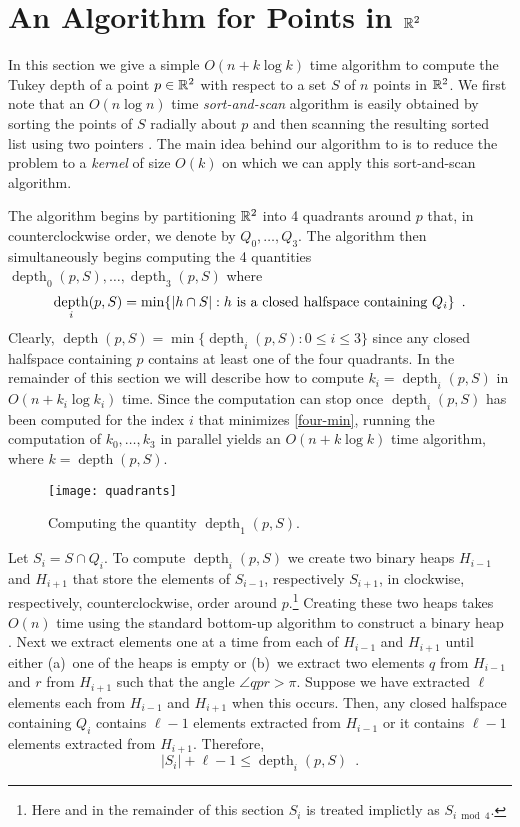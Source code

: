 \documentclass[charterfonts,lotsofwhite]{patmorin}
\DeclareMathOperator{\td}{depth}
\begin{document}
\section{An Algorithm for Points in $\mathbb{R}^2$}

In this section we give a simple $O(n + k\log k)$ time algorithm to
compute the Tukey depth of a point $p\in\mathbb{R}^2$ with respect to a set
$S$ of $n$ points in $\mathbb{R}^2$.  We first note that an $O(n\log n)$ time
\emph{sort-and-scan} algorithm is easily obtained by sorting the
points of $S$ radially about $p$ and then scanning the resulting
sorted list using two pointers \cite{m91}.  The main idea behind our
algorithm to is to reduce the problem to a \emph{kernel} of size
$O(k)$ on which we can apply this sort-and-scan algorithm.

The algorithm begins by partitioning $\mathbb{R}^2$ into 4 quadrants around
$p$ that, in counterclockwise order, we denote by $Q_0,\ldots,Q_3$.
The algorithm then simultaneously begins computing the 4 quantities
$\td_0(p,S),\ldots,\td_3(p,S)$ where 
\begin{equation}
     \td_i(p,S) = \min\{|h\cap S| : \mbox{$h$ is a closed halfspace containing $Q_i$} \} \enspace . \eqlabel{four-min}
\end{equation}
Clearly, $\td(p,S) = \min\{\td_i(p,S): 0\le i \le 3 \}$ since any
closed halfspace containing $p$ contains at least one of the four quadrants.
In the remainder of this section we will describe how to compute
$k_i=\td_i(p,S)$ in $O(n + k_i\log k_i)$ time.  Since the
computation can stop once $\td_i(p,S)$ has been computed for
the index $i$ that minimizes \eqref{four-min}, running the computation
of $k_0,\ldots,k_3$ in parallel yields an $O(n +
k\log k)$ time algorithm, where $k=\td(p,S)$.

\begin{figure}
\begin{center} \texttt{[image: quadrants]} \end{center}
\caption{Computing the quantity $\td_1(p,S)$.}
\end{figure}


Let $S_i=S\cap Q_i$. To compute $\td_i(p,S)$ we create two binary
heaps $H_{i-1}$ and $H_{i+1}$ that store the elements of $S_{i-1}$,
respectively $S_{i+1}$, in clockwise, respectively, counterclockwise,
order around $p$.\footnote{Here and in the remainder of this section
$S_i$ is treated implictly as $S_{i\bmod 4}$.} 
Creating these two heaps takes $O(n)$ time using the
standard bottom-up algorithm to construct a binary heap
\cite[Chapter~6]{clrs01}.
Next we extract elements one at a time from each of $H_{i-1}$ and
$H_{i+1}$ until either (a)~one of the heaps is empty or (b)~we extract
two elements $q$ from $H_{i-1}$ and $r$ from $H_{i+1}$ such that the
angle $\angle qpr > \pi$.  Suppose we have extracted $\ell$ elements
each from $H_{i-1}$ and $H_{i+1}$ when this occurs.  
Then, any closed halfspace containing $Q_i$ contains $\ell-1$
elements extracted from $H_{i-1}$ or it contains $\ell-1$ elements
extracted from $H_{i+1}$.  Therefore,
\[  
  |S_i| + \ell - 1 \le \td_i(p,S) \enspace .
\]
\end{document}

